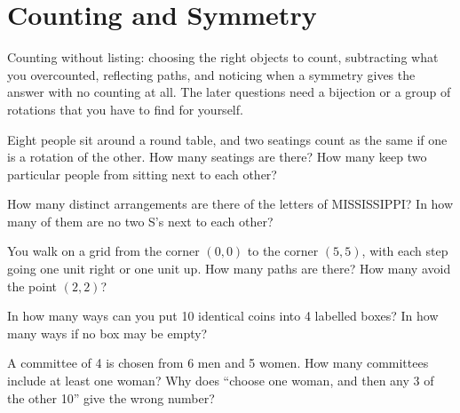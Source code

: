 \chapter{Counting and Symmetry}\label{ch:iv1:counting-and-symmetry}

\begin{ivtrains}
Counting without listing: choosing the right objects to count, subtracting what you overcounted, reflecting paths, and noticing
when a symmetry gives the answer with no counting at all. The later questions need a bijection or a group of rotations that you
have to find for yourself.
\end{ivtrains}

\begin{question}\label{iq:iv1:counting-and-symmetry:1}
Eight people sit around a round table, and two seatings count as the same if one is a rotation of the other. How many seatings are there? How many keep two particular people from sitting next to each other?
\end{question}

\begin{question}\label{iq:iv1:counting-and-symmetry:2}
How many distinct arrangements are there of the letters of MISSISSIPPI? In how many of them are no two S's next to each other?
\end{question}

\begin{question}\label{iq:iv1:counting-and-symmetry:3}
You walk on a grid from the corner $(0, 0)$ to the corner $(5, 5)$, with each step going one unit right or one unit up. How many paths are there? How many avoid the point $(2, 2)$?
\end{question}

\begin{question}\label{iq:iv1:counting-and-symmetry:4}
In how many ways can you put 10 identical coins into 4 labelled boxes? In how many ways if no box may be empty?
\end{question}

\begin{question}\label{iq:iv1:counting-and-symmetry:5}
A committee of 4 is chosen from 6 men and 5 women. How many committees include at least one woman? Why does ``choose one woman, and then any 3 of the other 10'' give the wrong number?
\end{question}

